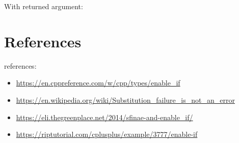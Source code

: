\documentclass[11pt,a4paper]{article}
\begin{document}
With returned argument:



\section{References}


references:
\begin{itemize}
\item \url{https://en.cppreference.com/w/cpp/types/enable_if}
\item \url{https://en.wikipedia.org/wiki/Substitution_failure_is_not_an_error}
\item \url{https://eli.thegreenplace.net/2014/sfinae-and-enable_if/}
\item \url{https://riptutorial.com/cplusplus/example/3777/enable-if}
\end{itemize}
\end{document}
